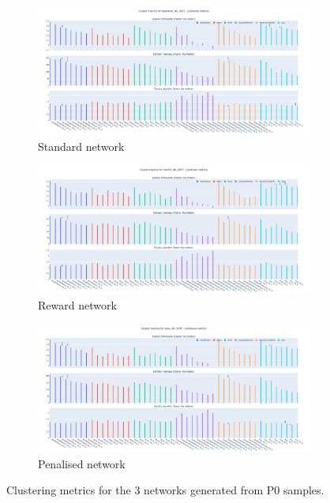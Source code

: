 \begin{figure}[!htb]
    \centering
    \begin{subfigure}{1.0\linewidth}
        \centering
        \includegraphics[width=1.0\textwidth,height=0.27\textheight]{Sections/Network_I/Resources/P0/CA_metrics_Std_2_tum_4k.png}
        \caption{Standard network}
    \end{subfigure} %

    \begin{subfigure}{1.0\linewidth}
        \centering
        \includegraphics[width=1.0\textwidth,height=0.27\textheight]{Sections/Network_I/Resources/P0/CA_metrics_Rwd_2_tum_4k.png}
        \caption{Reward network}
    \end{subfigure}
    
    \begin{subfigure}{1.0\linewidth}
        \centering
        \includegraphics[width=1.0\textwidth,height=0.27\textheight]{Sections/Network_I/Resources/P0/CA_metrics_Pen_2_tum_4k.png}
        \caption{Penalised network}
    \end{subfigure}
    \caption{Clustering metrics for the 3 networks generated from P0 samples.}
    \label{fig:N_I:p0_choosing_cs}
\end{figure}




